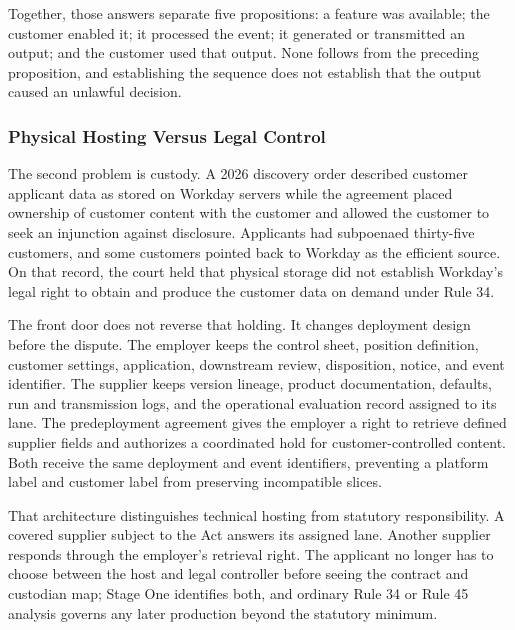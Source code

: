Together, those answers separate five propositions: a feature was available; the customer enabled it; it processed the event; it generated or transmitted an output; and the customer used that output. None follows from the preceding proposition, and establishing the sequence does not establish that the output caused an unlawful decision.

\subsubsection{Physical Hosting Versus Legal Control}

The second problem is custody. A 2026 discovery order described customer applicant data as stored on Workday servers while the agreement placed ownership of customer content with the customer and allowed the customer to seek an injunction against disclosure. Applicants had subpoenaed thirty-five customers, and some customers pointed back to Workday as the efficient source. On that record, the court held that physical storage did not establish Workday's legal right to obtain and produce the customer data on demand under Rule 34.

The front door does not reverse that holding. It changes deployment design before the dispute. The employer keeps the control sheet, position definition, customer settings, application, downstream review, disposition, notice, and event identifier. The supplier keeps version lineage, product documentation, defaults, run and transmission logs, and the operational evaluation record assigned to its lane. The predeployment agreement gives the employer a right to retrieve defined supplier fields and authorizes a coordinated hold for customer-controlled content. Both receive the same deployment and event identifiers, preventing a platform label and customer label from preserving incompatible slices.

That architecture distinguishes technical hosting from statutory responsibility. A covered supplier subject to the Act answers its assigned lane. Another supplier responds through the employer's retrieval right. The applicant no longer has to choose between the host and legal controller before seeing the contract and custodian map; Stage One identifies both, and ordinary Rule 34 or Rule 45 analysis governs any later production beyond the statutory minimum.

